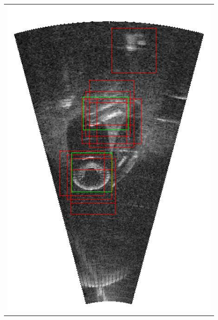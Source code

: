\begin{figure}[p]
{\begin{tabular}[b]{c}
		\includegraphics[height=0.22\textheight]{chapters/images/proposals/detections/nms-070-2016-02-11_070611-frame04292-topK10-proposals.jpg}

\end{tabular}}
\end{figure}
